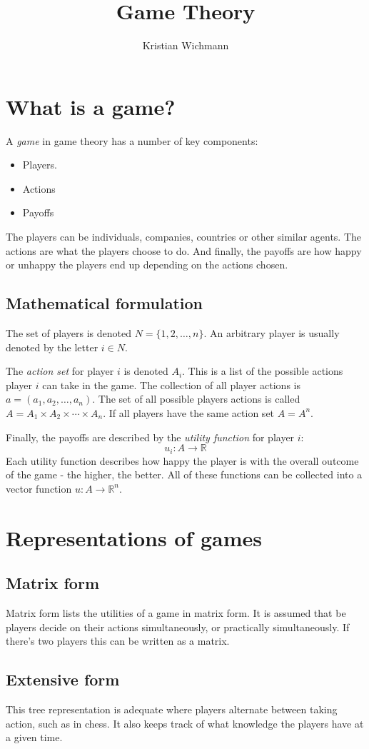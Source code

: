 \documentclass[12pt, a4paper]{article}
\title{Game Theory}
\author{Kristian Wichmann}
\begin{document}
\maketitle

\section{What is a game?}
A \textit{game} in game theory has a number of key components:
\begin{itemize}
\item Players.
\item Actions
\item Payoffs
\end{itemize}
The players can be individuals, companies, countries or other similar agents. The actions are what the players choose to do. And finally, the payoffs are how happy or unhappy the players end up depending on the actions chosen.

\subsection{Mathematical formulation}
The set of players is denoted $N=\{1, 2,\ldots,n\}$. An arbitrary player is usually denoted by the letter $i\in N$.

The \textit{action set} for player $i$ is denoted $A_i$. This is a list of the possible actions player $i$ can take in the game. The collection of all player actions is $a=(a_1,a_2,\ldots,a_n)$. The set of all possible players actions is called $A=A_1\times A_2\times\cdots\times A_n$. If all players have the same action set $A=A^n$.

Finally, the payoffs are described by the \textit{utility function} for player $i$:
\begin{equation}
u_i: A\rightarrow\mathbb{R}
\end{equation}
Each utility function describes how happy the player is with the overall outcome of the game - the higher, the better. All of these functions can be collected into a vector function $u: A\rightarrow\mathbb{R}^n$.

\section{Representations of games}

\subsection{Matrix form}
Matrix form lists the utilities of a game in matrix form. It is assumed that be players decide on their actions simultaneously, or practically simultaneously. If there's two players this can be written as a matrix.



\subsection{Extensive form}
This tree representation is adequate where players alternate between taking action, such as in chess. It also keeps track of what knowledge the players have at a given time.
\end{document}
